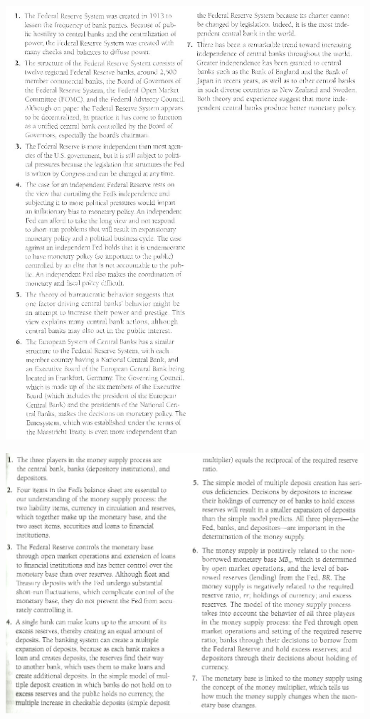 \documentclass[12pt]{examnotes}
\begin{document}
\includegraphics[scale=0.5]{./imgs/sum14.jpg}

\includegraphics[scale=0.45]{./imgs/sum15.jpg}
\end{document}
